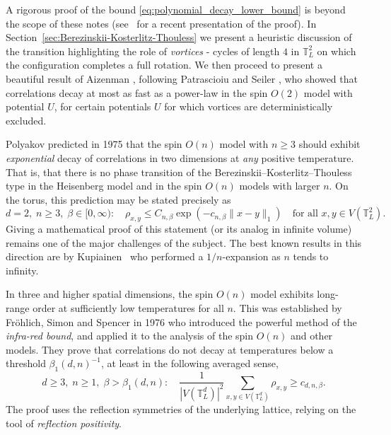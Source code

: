 \documentclass[12pt,reqno]{article}
\def\T{\mathbb{T}}
\begin{document}
A rigorous proof of the bound
\eqref{eq:polynomial_decay_lower_bound} is beyond the scope of these
notes (see~\cite{kharash2017fr} for a recent presentation of the proof). In Section~\ref{sec:Berezinskii-Kosterlitz-Thouless} we
present a heuristic discussion of the transition highlighting the
role of \emph{vortices} - cycles of length $4$ in $\T_L^2$ on which
the configuration completes a full rotation. We then proceed to
present a beautiful result of Aizenman \cite{Aiz94}, following
Patrascioiu and Seiler \cite{PatSei92}, who showed that correlations
decay at most as fast as a power-law in the spin $O(2)$ model with
potential $U$, for certain potentials $U$ for which vortices are
deterministically excluded.

\medbreak
{} Polyakov
\cite{polyakov1975interaction} predicted in 1975 that the spin $O(n)$
model with $n\ge 3$ should exhibit \emph{exponential} decay of correlations
in two dimensions at \emph{any} positive temperature. That is, that there is no
phase transition of the Berezinskii--Kosterlitz--Thouless type in the
Heisenberg model and in the spin $O(n)$ models with larger $n$. On the torus, this
prediction may be stated precisely as
\begin{equation*}
  d=2,\; n\ge 3,\; \beta\in[0,\infty)\colon\quad \rho_{x,y}\le C_{n,\beta}\exp(-c_{n,\beta}\|x-y\|_1)\quad\text{for all $x,y\in V(\T_L^2)$}.
\end{equation*}
Giving a mathematical proof of this statement (or its analog in infinite volume) remains one of the
major challenges of the subject. The best known results in this
direction are by Kupiainen~\cite{Kup80} who performed a $1/n$-expansion as $n$ tends to infinity.

\medbreak
{}
In three and higher spatial dimensions, the spin $O(n)$ model
exhibits long-range order at sufficiently low temperatures for all
$n$. This was established by Fr\"ohlich, Simon and Spencer
\cite{FroSimSpe76} in 1976 who introduced the powerful method of the
\emph{infra-red bound}, and applied it to the analysis of the spin
$O(n)$ and other models. They
prove that correlations do not decay at temperatures below a
threshold $\beta_1(d,n)^{-1}$, at least in the following averaged sense,
\begin{equation*}
  d\ge 3,\; n\ge 1,\; \beta>\beta_1(d,n)\colon\quad\frac{1}{|V(\T_L^d)|^2}\sum_{x,y\in V(\T_L^d)}\rho_{x,y} \ge c_{d,n,\beta}.
\end{equation*}
The proof uses the reflection symmetries of the underlying lattice,
relying on the tool of \emph{reflection positivity}.
\end{document}
